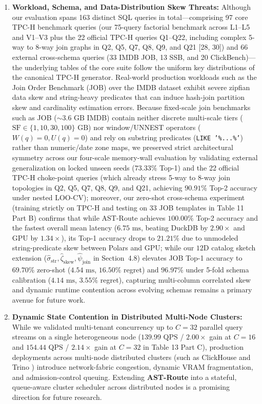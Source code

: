 \documentclass[10pt,a4paper]{article}
\begin{document}
\begin{enumerate}[leftmargin=1.5em,itemsep=2pt]
    \item \textbf{Workload, Schema, and Data-Distribution Skew Threats:} Although our evaluation spans 163 distinct SQL queries in total---comprising 97 core TPC-H benchmark queries (our 75-query factorial benchmark across L1--L5 and V1--V3 plus the 22 official TPC-H queries Q1--Q22, including complex 5-way to 8-way join graphs in Q2, Q5, Q7, Q8, Q9, and Q21 [28, 30]) and 66 external cross-schema queries (33 IMDB JOB, 13 SSB, and 20 ClickBench)---the underlying tables of the core suite follow the uniform key distributions of the canonical TPC-H generator. Real-world production workloads such as the Join Order Benchmark (JOB) \cite{leis2015job} over the IMDB dataset exhibit severe zipfian data skew and string-heavy predicates that can induce hash-join partition skew and cardinality estimation errors. Because fixed-scale join benchmarks such as JOB ($\sim 3.6\text{ GB}$ IMDB) contain neither discrete multi-scale tiers ($\text{SF} \in \{1, 10, 30, 100\}\text{ GB}$) nor window/UNNEST operators ($W(q)=0, U(q)=0$) and rely on substring predicates (\texttt{LIKE '\%...\%'}) rather than numeric/date zone maps, we preserved strict architectural symmetry across our four-scale memory-wall evaluation by validating external generalization on locked unseen seeds ($73.33\%$ Top-1) and the 22 official TPC-H choke-point queries (which already stress 5-way to 8-way join topologies in Q2, Q5, Q7, Q8, Q9, and Q21, achieving $90.91\%$ Top-2 accuracy under nested LOO-CV); moreover, our zero-shot cross-schema experiment (training strictly on TPC-H and testing on 33 JOB templates in Table 11 Part B) confirms that while AST-Route achieves $100.00\%$ Top-2 accuracy and the fastest overall mean latency ($6.75\text{ ms}$, beating DuckDB by $2.90\times$ and GPU by $1.34\times$), its Top-1 accuracy drops to $21.21\%$ due to unmodeled string-predicate skew between Polars and GPU; while our $12\text{D}$ catalog sketch extension ($\hat{\sigma}_{\text{str}}, \hat{\zeta}_{\text{skew}}, \hat{\psi}_{\text{join}}$ in Section~4.8) elevates JOB Top-1 accuracy to $69.70\%$ zero-shot ($4.54\text{ ms}$, $16.50\%$ regret) and $96.97\%$ under 5-fold schema calibration ($4.14\text{ ms}$, $3.55\%$ regret), capturing multi-column correlated skew and dynamic runtime contention across evolving schemas remains a primary avenue for future work.
    \item \textbf{Dynamic State Contention in Distributed Multi-Node Clusters:} While we validated multi-tenant concurrency up to $C=32$ parallel query streams on a single heterogeneous node ($139.99\text{ QPS}$ / $2.00\times$ gain at $C=16$ and $154.44\text{ QPS}$ / $2.14\times$ gain at $C=32$ in Table 13 Part C), production deployments across multi-node distributed clusters (such as ClickHouse \cite{schulze2024clickhouse} and Trino \cite{sethi2019presto}) introduce network-fabric congestion, dynamic VRAM fragmentation, and admission-control queuing. Extending \textbf{AST-Route} into a stateful, queue-aware cluster scheduler across distributed nodes is a promising direction for future research.
\end{enumerate}
\end{document}
